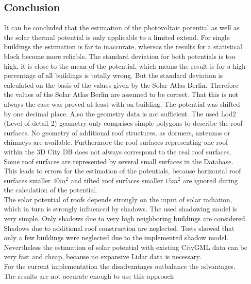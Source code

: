 \subsection{Conclusion}
It can be concluded that the estimation of the photovoltaic potential as well as the solar thermal potential is only applicable to a limited extend. For single buildings the estimation is far to inaccurate, whereas the results for a statistical block become more reliable. The standard deviation for both potentials is too high, it is close to the mean of the potential, which means the result is for a high percentage of all buildings is totally wrong. But the standard deviation is calculated on the basis of the values given by the Solar Atlas Berlin. Therefore the values of the Solar Atlas Berlin are assumed to be correct. That this is not always the case was proved at least with on building. The potential was shifted by one decimal place. Also the geometry data is not sufficient. The used Lod2 (Level of detail 2) geometry only comprises simple polygons to describe the roof surfaces. No geometry of additional roof structures, as dormers, antennas or chimneys are  available. Furthermore the roof surfaces 
representing one roof within the 3D City DB does not always correspond to the real roof surfaces. Some roof surfaces are represented by several small surfaces in the Database. This leads to errors for the estimation of the potentials, because horizontal roof surfaces smaller \(40m^2\) and tilted roof surfaces smaller \(15m^2\) are ignored during the calculation of the potential. \\
The solar potential of roofs depends strongly on the input of solar radiation, which in turn is strongly influenced by shadows. The used shadowing model is very simple. Only shadows due to very high neighboring buildings are considered. Shadows due to additional roof construction are neglected. Tests showed that only a few buildings were neglected due to the implemented shadow model. \\
Nevertheless the estimation of solar potential with existing CityGML data can be very fast and cheap, because no expansive Lidar data is necessary.\\
For the current implementation the disadvantages outbalance the advantages. The results are not accurate enough to use this approach 